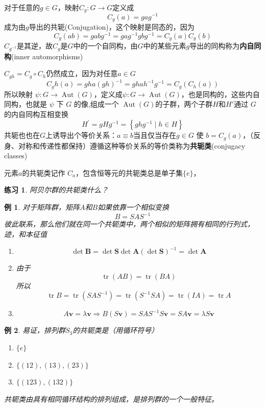 \documentclass[hyperref,UTF8]{ctexbook}
\newtheorem{eg}{例}[chapter]
\newtheorem*{exercise}{练习}
\begin{document}
对于任意的$g\in G$，映射$C_g:G\rightarrow G $定义成
\begin{equation}\label{eq:2.14}
    C_{g}(a)=g a g^{-1}
\end{equation}
成为由$g$导出的共轭(Conjugation)，这个映射是同态的，因为$$
C_{g}(a b)=g a b g^{-1}=g a g^{-1} g b g^{-1}=C_{g}(a) C_{g}(b)
$$
$C_{g^{-1}}$是其逆，故$C_g$是$G$中的一个自同构，由$G$中的某些元素$g$导出的同构称为\textbf{内自同构}(inner automorphisms)

$C_{g h}=C_{g} \circ C_{h}$仍然成立，因为对任意$a\in G$
$$
C_{g} h(a)=g h a(g h)^{-1}=g h a h^{-1} g^{-1}=C_{g}\left(C_{h}(a)\right)
$$
所以映射 $\psi: G \rightarrow \operatorname{Aut}(G)$，定义成$\psi: G \rightarrow \operatorname{Aut}(G)$，也是同构的，这些内自同构，也就是 $\psi$  下 $G$  的像,组成一个 $\operatorname{Aut}(G)$的子群，两个子群\(H\)和\(H'\)通过 $G$的内自同构互相变换
$$
H^{\prime}=g H g^{-1}=\left\{g h g^{-1} \mid h \in H\right\}
$$
共轭也也在\(G\)上诱导出个等价关系：$a \equiv b$当且仅当存在\(g\in G\) 使 $b=C_{g}(a)$，（反身、对称和传递性都保持）遵循这种等价关系的等价类称为\textbf{共轭类}(conjugacy classes)

元素$a$的共轭类记作 $C_a$，包含恒等元的共轭类总是单子集\(\{e\}\)，

\begin{exercise}
    阿贝尔群的共轭类什么？
\end{exercise}
\begin{eg}
    对于矩阵群，矩阵$A$和\(B\)如果依靠一个相似变换
    \[B=SAS^{-1}\]彼此联系，那么他们就在同一个共轭类中，两个相似的矩阵拥有相同的行列式，迹，和本征值
    \begin{enumerate}
        \item $$
        \operatorname{det} \mathbf{B}=\operatorname{det} \mathbf{S} \operatorname{det} \mathbf{A}(\operatorname{det} \mathbf{S})^{-1}=\operatorname{det} \mathbf{A}
        $$
        \item 由于\begin{equation}\label{eq:2.15}
            \operatorname{tr} (AB)=\operatorname{tr} (BA)
        \end{equation}
        所以$$
        \operatorname{tr} B=\operatorname{tr}\left(S A S^{-1}\right)=\operatorname{tr}\left(S^{-1} S A\right)=\operatorname{tr}(I A)=\operatorname{tr} A
        $$
        \item $$
        A\mathbf{v}=\lambda \mathbf{v} \Longrightarrow B(S \mathbf{v})=SAS^{-1} S \mathbf{v}=SA \mathbf{v}=\lambda S\mathbf{v}
        $$
    \end{enumerate}
\end{eg}
\begin{eg}
    易证，排列群\(S_3\)的共轭类是（用循环符号）
    \begin{enumerate}
        \item $\{e\}$
        \item $\{(12),(13),(23)\}$
        \item $\{(123),(132)\} $
    \end{enumerate}
    共轭类由具有相同循环结构的排列组成，是排列群的一个一般特征。
\end{eg}
\end{document}
